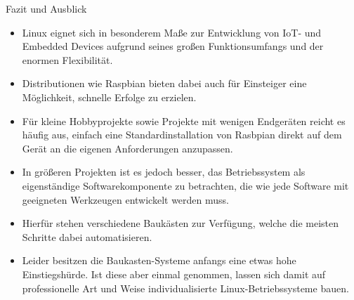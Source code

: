 \begin{frame}{Fazit und Ausblick}
    \begin{itemize}
        \justifying

        \item Linux eignet sich in besonderem Maße zur Entwicklung von IoT-
        und Embedded Devices aufgrund seines großen Funktionsumfangs und der
        enormen Flexibilität.

        \item Distributionen wie Raspbian bieten dabei auch für Einsteiger
        eine Möglichkeit, schnelle Erfolge zu erzielen.

        \item Für kleine Hobbyprojekte sowie Projekte mit wenigen Endgeräten
        reicht es häufig aus, einfach eine Standardinstallation von Rasbpian
        direkt auf dem Gerät an die eigenen Anforderungen anzupassen.

        \item In größeren Projekten ist es jedoch besser, das Betriebssystem als
        eigenständige Softwarekomponente zu betrachten, die wie jede Software
        mit geeigneten Werkzeugen \glqq{}entwickelt\grqq{} werden muss.

        \item Hierfür stehen verschiedene Baukästen zur Verfügung, welche die
        meisten Schritte dabei automatisieren.

        \item Leider besitzen die Baukasten-Systeme anfangs eine etwas hohe
        Einstiegshürde. Ist diese aber einmal genommen, lassen sich damit auf
        professionelle Art und Weise individualisierte Linux-Betriebssysteme bauen.
    \end{itemize}
\end{frame}

